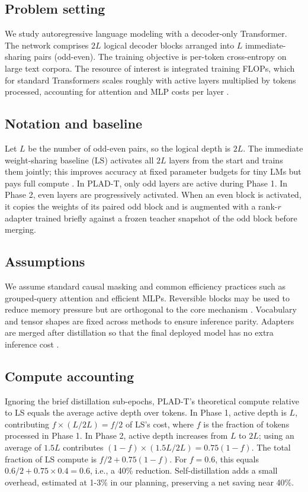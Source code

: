 \documentclass{article}
\begin{document}
\subsection{Problem setting}
We study autoregressive language modeling with a decoder-only Transformer. The network comprises \(2L\) logical decoder blocks arranged into \(L\) immediate-sharing pairs (odd-even). The training objective is per-token cross-entropy on large text corpora. The resource of interest is integrated training FLOPs, which for standard Transformers scales roughly with active layers multiplied by tokens processed, accounting for attention and MLP costs per layer \cite{henighan-2020-scaling}.

\subsection{Notation and baseline}
Let \(L\) be the number of odd-even pairs, so the logical depth is \(2L\). The immediate weight-sharing baseline (LS) activates all \(2L\) layers from the start and trains them jointly; this improves accuracy at fixed parameter budgets for tiny LMs but pays full compute \cite{liu-2024-mobilellm}. In PLAD-T, only odd layers are active during Phase 1. In Phase 2, even layers are progressively activated. When an even block is activated, it copies the weights of its paired odd block and is augmented with a rank-\(r\) adapter trained briefly against a frozen teacher snapshot of the odd block before merging.

\subsection{Assumptions}
We assume standard causal masking and common efficiency practices such as grouped-query attention and efficient MLPs. Reversible blocks may be used to reduce memory pressure but are orthogonal to the core mechanism \cite{kitaev-2020-reformer}. Vocabulary and tensor shapes are fixed across methods to ensure inference parity. Adapters are merged after distillation so that the final deployed model has no extra inference cost \cite{miles-2024-velora}.

\subsection{Compute accounting}
Ignoring the brief distillation sub-epochs, PLAD-T’s theoretical compute relative to LS equals the average active depth over tokens. In Phase 1, active depth is \(L\), contributing \(f \times (L / 2L) = f/2\) of LS’s cost, where \(f\) is the fraction of tokens processed in Phase 1. In Phase 2, active depth increases from \(L\) to \(2L\); using an average of \(1.5L\) contributes \((1-f) \times (1.5L / 2L) = 0.75(1-f)\). The total fraction of LS compute is \(f/2 + 0.75(1-f)\). For \(f = 0.6\), this equals \(0.6/2 + 0.75\times0.4 = 0.6\), i.e., a 40\% reduction. Self-distillation adds a small overhead, estimated at 1-3\% in our planning, preserving a net saving near 40\%.
\end{document}

